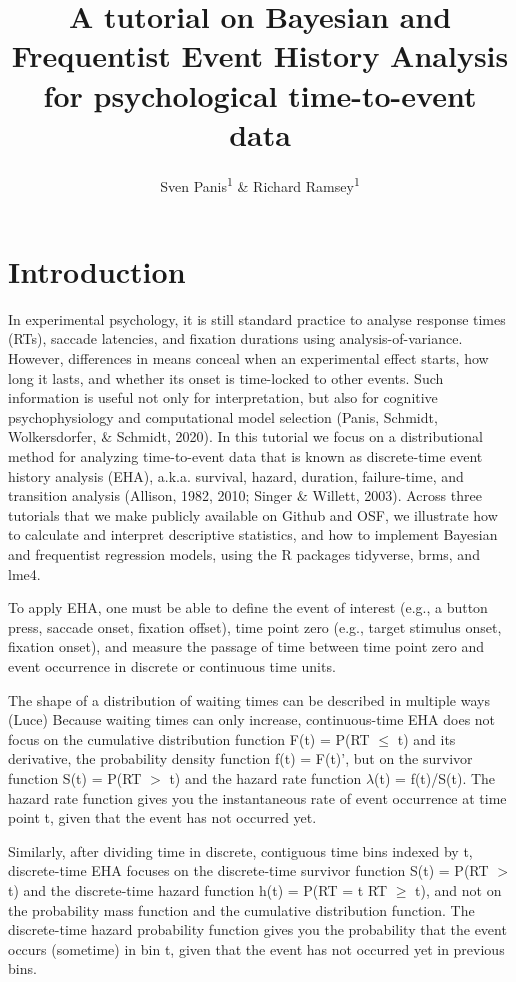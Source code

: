 \documentclass[
  man,floatsintext]{apa6}
\title{A tutorial on Bayesian and Frequentist Event History Analysis for psychological time-to-event data}
\author{Sven Panis\textsuperscript{1} \& Richard Ramsey\textsuperscript{1}}
\date{}
\affiliation{\vspace{0.5cm}\textsuperscript{1} ETH Zürich}
\begin{document}
\maketitle

\section{Introduction}\label{introduction}

In experimental psychology, it is still standard practice to analyse response times (RTs), saccade latencies, and fixation durations using analysis-of-variance. However, differences in means conceal when an experimental effect starts, how long it lasts, and whether its onset is time-locked to other events. Such information is useful not only for interpretation, but also for cognitive psychophysiology and computational model selection (Panis, Schmidt, Wolkersdorfer, \& Schmidt, 2020).
In this tutorial we focus on a distributional method for analyzing time-to-event data that is known as discrete-time event history analysis (EHA), a.k.a. survival, hazard, duration, failure-time, and transition analysis (Allison, 1982, 2010; Singer \& Willett, 2003). Across three tutorials that we make publicly available on Github and OSF, we illustrate how to calculate and interpret descriptive statistics, and how to implement Bayesian and frequentist regression models, using the R packages tidyverse, brms, and lme4.

To apply EHA, one must be able to define the event of interest (e.g., a button press, saccade onset, fixation offset), time point zero (e.g., target stimulus onset, fixation onset), and measure the passage of time between time point zero and event occurrence in discrete or continuous time units.

The shape of a distribution of waiting times can be described in multiple ways (Luce)
Because waiting times can only increase, continuous-time EHA does not focus on the cumulative distribution function F(t) = P(RT \(\leq\) t) and its derivative, the probability density function f(t) = F(t)', but on the survivor function S(t) = P(RT \(>\) t) and the hazard rate function \(\lambda\)(t) = f(t)/S(t). The hazard rate function gives you the instantaneous rate of event occurrence at time point t, given that the event has not occurred yet.

Similarly, after dividing time in discrete, contiguous time bins indexed by t, discrete-time EHA focuses on the discrete-time survivor function S(t) = P(RT \(>\) t) and the discrete-time hazard function h(t) = P(RT = t\textbar{} RT \(\geq\) t), and not on the probability mass function and the cumulative distribution function. The discrete-time hazard probability function gives you the probability that the event occurs (sometime) in bin t, given that the event has not occurred yet in previous bins.
\end{document}
